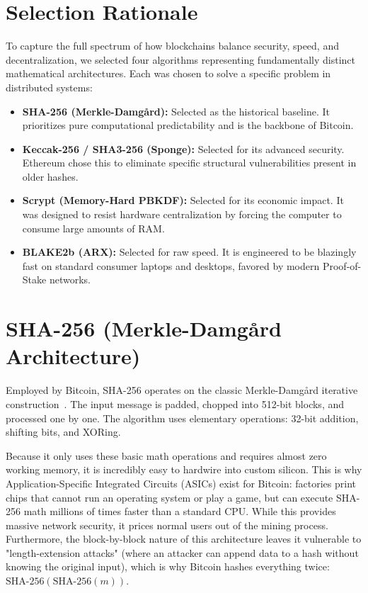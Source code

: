\documentclass[11pt,a4paper,oneside]{book}
\begin{document}
\section{Selection Rationale}
To capture the full spectrum of how blockchains balance security, speed, and decentralization, we selected four algorithms representing fundamentally distinct mathematical architectures. Each was chosen to solve a specific problem in distributed systems:
\begin{itemize}
    \item \textbf{SHA-256 (Merkle-Damg{\aa}rd):} Selected as the historical baseline. It prioritizes pure computational predictability and is the backbone of Bitcoin.
    \item \textbf{Keccak-256 / SHA3-256 (Sponge):} Selected for its advanced security. Ethereum chose this to eliminate specific structural vulnerabilities present in older hashes.
    \item \textbf{Scrypt (Memory-Hard PBKDF):} Selected for its economic impact. It was designed to resist hardware centralization by forcing the computer to consume large amounts of RAM.
    \item \textbf{BLAKE2b (ARX):} Selected for raw speed. It is engineered to be blazingly fast on standard consumer laptops and desktops, favored by modern Proof-of-Stake networks.
\end{itemize}

\section{SHA-256 (Merkle-Damg{\aa}rd Architecture)}
Employed by Bitcoin, SHA-256 operates on the classic Merkle-Damg{\aa}rd iterative construction~\cite{nakamoto2008bitcoin, schneier1996applied}. The input message is padded, chopped into 512-bit blocks, and processed one by one. The algorithm uses elementary operations: 32-bit addition, shifting bits, and XORing.

Because it only uses these basic math operations and requires almost zero working memory, it is incredibly easy to hardwire into custom silicon. This is why Application-Specific Integrated Circuits (ASICs) exist for Bitcoin: factories print chips that cannot run an operating system or play a game, but can execute SHA-256 math millions of times faster than a standard CPU. While this provides massive network security, it prices normal users out of the mining process. Furthermore, the block-by-block nature of this architecture leaves it vulnerable to "length-extension attacks" (where an attacker can append data to a hash without knowing the original input), which is why Bitcoin hashes everything twice: $\text{SHA-256}(\text{SHA-256}(m))$.
\end{document}
